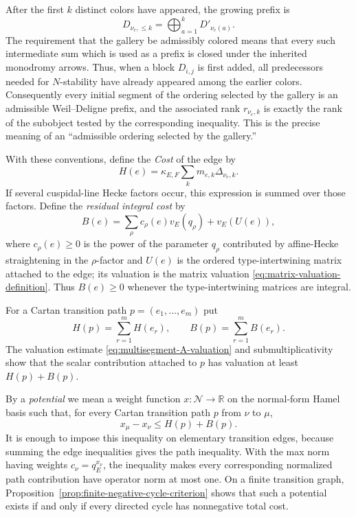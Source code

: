 \documentclass[12pt]{article}
\theoremstyle{definition}
\theoremstyle{remark}
\begin{document}
After the first \(k\) distinct colors have appeared, the growing prefix is
\[
 D_{\nu_e,\leq k}
 =\bigoplus_{a=1}^kD'_{\nu_e(a)}.
\]
The requirement that the gallery be admissibly colored means that every such
intermediate sum which is used as a prefix is closed under the inherited
monodromy arrows.  Thus, when a block \(D_{i,j}\) is first added, all
predecessors needed for \(N\)-stability have already appeared among the
earlier colors.  Consequently every initial segment of the ordering selected
by the gallery is an admissible Weil--Deligne prefix, and the associated
rank \(r_{\nu_e,k}\) is exactly the rank of the subobject tested by the
corresponding inequality.  This is the precise meaning of an
``admissible ordering selected by the gallery.''

With these conventions, define the \emph{Cost} of the edge by
\begin{equation}\label{eq:edge-cost-definition}
 H(e)=\kappa_{E,F}\sum_km_{e,k}\Delta_{\nu_e,k}.
\end{equation}
If several cuspidal-line Hecke factors occur, this expression is summed over
those factors.  Define the \emph{residual integral cost} by
\begin{equation}\label{eq:residual-edge-cost-definition}
 B(e)=\sum_\rho c_\rho(e)v_E(q_\rho)+v_E(U(e)),
\end{equation}
where $c_\rho(e)\geq0$ is the power of the parameter $q_\rho$ contributed by
affine-Hecke straightening in the $\rho$-factor and $U(e)$ is the ordered
type-intertwining matrix attached to the edge; its valuation is the matrix
valuation \eqref{eq:matrix-valuation-definition}.  Thus $B(e)\geq0$ whenever
the type-intertwining matrices are integral.

For a Cartan transition path $p=(e_1,\ldots,e_m)$ put
\begin{equation}\label{eq:H-B-path-definitions}
 H(p)=\sum_{r=1}^mH(e_r),
 \qquad
 B(p)=\sum_{r=1}^mB(e_r).
\end{equation}
The valuation estimate \eqref{eq:multisegment-A-valuation} and
submultiplicativity show that the scalar contribution attached to $p$ has
valuation at least $H(p)+B(p)$.

By a \emph{potential} we mean a weight function
$x:\mathscr N\to\mathbb R$ on the normal-form Hamel basis such that, for
every Cartan transition path $p$ from $\nu$ to $\mu$,
\begin{equation}\label{eq:potential-definition}
 x_\mu-x_\nu\leq H(p)+B(p).
\end{equation}
It is enough to impose this inequality on elementary transition edges,
because summing the edge inequalities gives the path inequality.  With the
max norm having weights $c_\nu=q_E^{x_\nu}$, the inequality makes every
corresponding normalized path contribution have operator norm at most one.
On a finite transition graph, Proposition~\ref{prop:finite-negative-cycle-criterion}
shows that such a potential exists if and only if every directed cycle has
nonnegative total cost.
\end{document}
